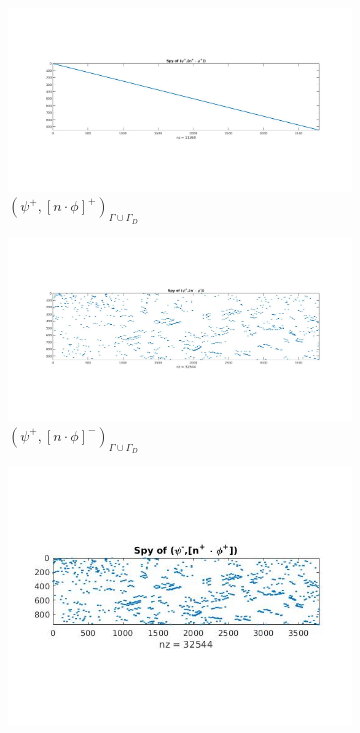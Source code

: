 \documentclass[a4paper]{book}
\begin{document}
\begin{figure}[H]
\begin{subfigure}{.5\textwidth}
\centering
  \includegraphics[width=\linewidth]{figure41.jpg}
  \caption{$( \psi^+ ,[n \cdot \phi]^+)_{\Gamma \cup \Gamma_D}$}
  \label{fig:figure41}
\end{subfigure}
\begin{subfigure}{.5\textwidth}	
\centering
  \includegraphics[width=\linewidth]{figure42.jpg}
  \caption{$( \psi^+ ,[n \cdot \phi]^-)_{\Gamma \cup \Gamma_D}$}
  \label{fig:figure42}
\end{subfigure}
\begin{subfigure}{.5\textwidth}
\centering
  \includegraphics[width=\linewidth]{figure43.jpg}

\end{subfigure}
\end{figure}
\end{document}
